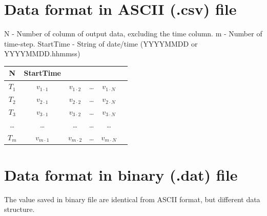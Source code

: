 \documentclass[
]{scrbook}
\begin{document}
\hypertarget{data-format-in-ascii-.csv-file}{%
\section{Data format in ASCII (.csv) file}\label{data-format-in-ascii-.csv-file}}

N - Number of column of output data, excluding the time column.
m - Number of time-step.
StartTime - String of date/time (YYYYMMDD or YYYYMMDD.hhmmss)

\begin{longtable}[]{@{}cccccc@{}}
\toprule
N & StartTime & & & &\tabularnewline
\midrule
\endhead
\(T_1\) & \(v_{1 \cdot 1}\) & \(v_{1 \cdot 2}\) & \ldots{} & \(v_{1 \cdot N}\) &\tabularnewline
\(T_2\) & \(v_{2 \cdot 1}\) & \(v_{2 \cdot 2}\) & \ldots{} & \(v_{2 \cdot N}\) &\tabularnewline
\(T_3\) & \(v_{3 \cdot 1}\) & \(v_{3 \cdot 2}\) & \ldots{} & \(v_{3 \cdot N}\) &\tabularnewline
\ldots{} & \ldots{} & \ldots{} & \ldots{} & \ldots{} &\tabularnewline
\(T_{m}\) & \(v_{m \cdot 1}\) & \(v_{m \cdot 2}\) & \ldots{} & \(v_{m \cdot N}\) &\tabularnewline
\bottomrule
\end{longtable}

\hypertarget{data-format-in-binary-.dat-file}{%
\section{Data format in binary (.dat) file}\label{data-format-in-binary-.dat-file}}

The value saved in binary file are identical from ASCII format, but different data structure.
\end{document}
